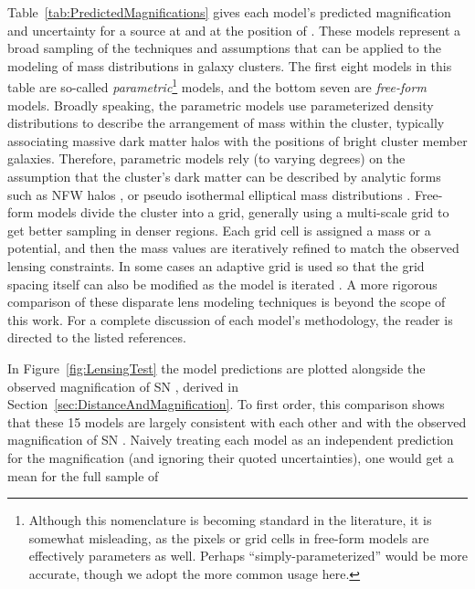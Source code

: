 Table~\ref{tab:PredictedMagnifications} gives each model's predicted
magnification and uncertainty for a source at  and
at the position of \tomas.  These models represent a broad sampling of
the techniques and assumptions that can be applied to the modeling of
mass distributions in galaxy clusters.  The first eight models in this
table are so-called {\it parametric}\footnote{Although this
nomenclature is becoming standard in the literature, it is somewhat
misleading, as the pixels or grid cells in free-form models are
effectively parameters as well. Perhaps ``simply-parameterized'' would
be more accurate, though we adopt the more common usage here.}
models, and the bottom seven are {\it free-form} models.  Broadly
speaking, the parametric models use parameterized density
distributions to describe the arrangement of mass within the cluster,
typically associating massive dark matter halos with the positions of
bright cluster member galaxies. Therefore, parametric models rely (to
varying degrees) on the assumption that the cluster's dark matter can
be described by analytic forms such as NFW halos \citep{Navarro:1997},
or pseudo isothermal elliptical mass
distributions \citep[PIEMD][]{Kassiola:1993}.  Free-form models divide
the cluster into a grid, generally using a multi-scale grid to get
better sampling in denser regions. Each grid cell is assigned a mass
or a potential, and then the mass values are iteratively refined to
match the observed lensing constraints. In some cases an adaptive grid
is used so that the grid spacing itself can also be modified as the
model is iterated \citep[e.g.][]{Liesenborgs:2006,Merten:2009}.  
A more rigorous comparison of these
disparate lens modeling techniques is beyond the scope of this
work.  For a complete discussion of each model's
methodology, the reader is directed to the listed references.


In Figure~\ref{fig:LensingTest} the model predictions are plotted
alongside the observed magnification of SN \tomas, derived in
Section~\ref{sec:DistanceAndMagnification}.  To first order, this
comparison shows that these 15 models are largely consistent with each
other and with the observed magnification of SN \tomas. Naively
treating each model as an independent prediction for the magnification
(and ignoring their quoted uncertainties), one would get a mean for
the full sample of 

